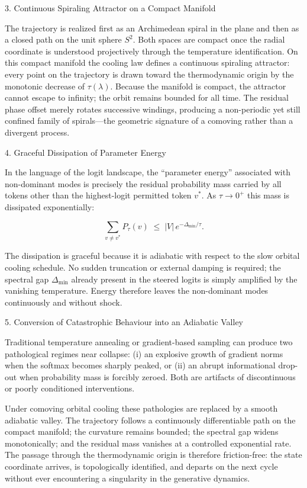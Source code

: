 3. Continuous Spiraling Attractor on a Compact Manifold

The trajectory is realized first as an Archimedean spiral in the plane and then as a closed path on the unit sphere \(S^2\). Both spaces are compact once the radial coordinate is understood projectively through the temperature identification. On this compact manifold the cooling law defines a continuous spiraling attractor: every point on the trajectory is drawn toward the thermodynamic origin by the monotonic decrease of \(\tau(\lambda)\). Because the manifold is compact, the attractor cannot escape to infinity; the orbit remains bounded for all time. The residual phase offset merely rotates successive windings, producing a non-periodic yet still confined family of spirals—the geometric signature of a comoving rather than a divergent process.

4. Graceful Dissipation of Parameter Energy

In the language of the logit landscape, the “parameter energy” associated with non-dominant modes is precisely the residual probability mass carried by all tokens other than the highest-logit permitted token \(v^*\). As \(\tau\to0^+\) this mass is dissipated exponentially:

\[
\sum_{v\neq v^*}P_{\tau}(v)\;\le\;|V|\,e^{-\Delta_{\min}/\tau}.
\]

The dissipation is graceful because it is adiabatic with respect to the slow orbital cooling schedule. No sudden truncation or external damping is required; the spectral gap \(\Delta_{\min}\) already present in the steered logits is simply amplified by the vanishing temperature. Energy therefore leaves the non-dominant modes continuously and without shock.

5. Conversion of Catastrophic Behaviour into an Adiabatic Valley

Traditional temperature annealing or gradient-based sampling can produce two pathological regimes near collapse: (i) an explosive growth of gradient norms when the softmax becomes sharply peaked, or (ii) an abrupt informational drop-out when probability mass is forcibly zeroed. Both are artifacts of discontinuous or poorly conditioned interventions.

Under comoving orbital cooling these pathologies are replaced by a smooth adiabatic valley. The trajectory follows a continuously differentiable path on the compact manifold; the curvature remains bounded; the spectral gap widens monotonically; and the residual mass vanishes at a controlled exponential rate. The passage through the thermodynamic origin is therefore friction-free: the state coordinate arrives, is topologically identified, and departs on the next cycle without ever encountering a singularity in the generative dynamics.


